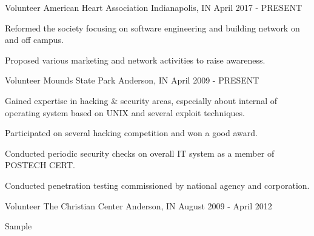 

\begin{cventries}

  \cventry
    {Volunteer} %
    {American Heart Association} %
    {Indianapolis, IN} %
    {April 2017 - PRESENT} %
    {
      \begin{cvitems} %
        \item {Reformed the society focusing on software engineering and building network on and off campus.}
        \item {Proposed various marketing and network activities to raise awareness.}
      \end{cvitems}
    }

  \cventry
    {Volunteer} %
    {Mounds State Park} %
    {Anderson, IN} %
    {April 2009 - PRESENT} %
    {
      \begin{cvitems} %
        \item {Gained expertise in hacking \& security areas, especially about internal of operating system based on UNIX and several exploit techniques.}
        \item {Participated on several hacking competition and won a good award.}
        \item {Conducted periodic security checks on overall IT system as a member of POSTECH CERT.}
        \item {Conducted penetration testing commissioned by national agency and corporation.}
      \end{cvitems}
    }

  \cventry
    {Volunteer}
    {The Christian Center}
    {Anderson, IN}
    {August 2009 - April 2012}
    {
      \begin{cvitems}
        \item {Sample}
      \end{cvitems}
    }
    


\end{cventries}
